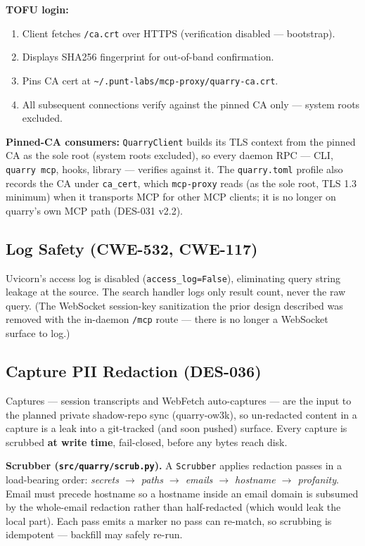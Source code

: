 \documentclass[a4paper,10pt]{article}
\newcommand{\modpath}[1]{\texttt{src/quarry/#1}}
\begin{document}
\textbf{TOFU login:}
\begin{enumerate}
  \item Client fetches \texttt{/ca.crt} over HTTPS (verification
    disabled --- bootstrap).
  \item Displays SHA256 fingerprint for out-of-band confirmation.
  \item Pins CA cert at
    \texttt{\~{}/.punt-labs/mcp-proxy/quarry-ca.crt}.
  \item All subsequent connections verify against the pinned CA only
    --- system roots excluded.
\end{enumerate}

\textbf{Pinned-CA consumers:} \texttt{QuarryClient} builds its TLS
context from the pinned CA as the sole root (system roots excluded), so
every daemon RPC --- CLI, \texttt{quarry mcp}, hooks, library --- verifies
against it.  The \texttt{quarry.toml} profile also records the CA under
\texttt{ca\_cert}, which \texttt{mcp-proxy} reads (as the sole root, TLS
1.3 minimum) when it transports MCP for other MCP clients; it is no longer
on quarry's own MCP path (DES-031 v2.2).

\subsection{Log Safety (CWE-532, CWE-117)}

Uvicorn's access log is disabled (\texttt{access\_log=False}),
eliminating query string leakage at the source.  The search handler
logs only result count, never the raw query.  (The WebSocket
session-key sanitization the prior design described was removed with the
in-daemon \texttt{/mcp} route --- there is no longer a WebSocket surface
to log.)

\subsection{Capture PII Redaction (DES-036)}

Captures --- session transcripts and WebFetch auto-captures --- are the
input to the planned private shadow-repo sync (quarry-ow3k), so
un-redacted content in a capture is a leak into a git-tracked (and soon
pushed) surface.  Every capture is scrubbed \textbf{at write time},
fail-closed, before any bytes reach disk.

\textbf{Scrubber (\modpath{scrub.py}).}  A \texttt{Scrubber} applies
redaction passes in a load-bearing order: \emph{secrets $\to$ paths
$\to$ emails $\to$ hostname $\to$ profanity}.  Email must precede
hostname so a hostname inside an email domain is subsumed by the
whole-email redaction rather than half-redacted (which would leak the
local part).  Each pass emits a marker no pass can re-match, so scrubbing
is idempotent --- backfill may safely re-run.
\end{document}
